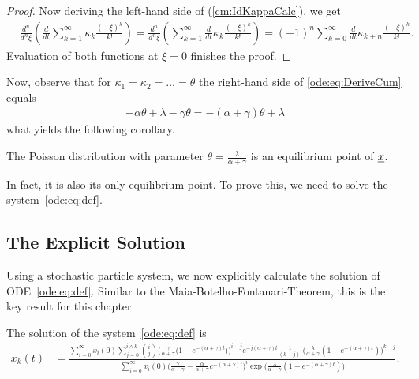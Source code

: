 \begin{proof}
\noindent
Now deriving the left-hand side of (\ref{cm:IdKappaCalc}), we get
\begin{align*}
&\frac{d^n}{d^n \xi}
\left(
\frac{d}{d t} \sum_{k=1}^\infty \kappa_k \frac{(-\xi)^k}{k!}
\right)
= \frac{d^n}{d^n \xi}
\left(
\sum_{k=1}^\infty \frac{d}{d t} \kappa_k \frac{(-\xi)^k}{k!}
\right)
= (-1)^n \sum_{k=0}^\infty \frac{d}{d t} \kappa_{k+n} \frac{(-\xi)^k}{k!} .
\end{align*}
Evaluation of both functions at $\xi = 0$ finishes the proof.
\end{proof}

\noindent
Now, observe that for $\kappa_1 = \kappa_2 = \ldots = \theta$ the right-hand side of
\eqref{ode:eq:DeriveCum} equals
\begin{align*}
-\alpha \theta + \lambda - \gamma \theta = - (\alpha + \gamma) \theta + \lambda
\end{align*}
what yields the following corollary.

\begin{Corollary}\label{ode:c:ex_stat_point}
The Poisson distribution with parameter $\theta = \frac{\lambda}{\alpha +
\gamma}$ is an equilibrium point of $\underline{x}$.
\end{Corollary}

\noindent
In fact, it is also its only equilibrium point. To prove this, we need to solve the
system~\eqref{ode:eq:def}.

\subsection{The Explicit Solution}
Using a stochastic particle system, we now explicitly calculate the solution of
ODE~\eqref{ode:eq:def}. Similar to the Maia-Botelho-Fontanari-Theorem, this is
the key result for this chapter.

\begin{Theorem} \label{ode:t:expl_solution}
The solution of the system~\eqref{ode:eq:def} is
\small
\begin{align} \label{ode:eq:expl_solution}
x_k(t) 
& = \frac{ \sum_{i=0}^\infty x_i(0) \sum_{j=0}^{i\wedge k}
    \binom{i}{j} \Big(\frac{\gamma}{\alpha+\gamma}\big(
    1-e^{-(\alpha+\gamma)t}\big)\Big)^{i-j}
    e^{-j(\alpha+\gamma)t} \frac{1}{(k-j)!}
    \Big(\frac{\lambda}{\alpha+\gamma} (1-e^{-(\alpha+\gamma)t})
    \Big)^{k-j}}{ \sum_{i=0}^\infty x_i(0)
    \Big(\frac{\gamma}{\alpha+\gamma} - \frac{\alpha}{\alpha+\gamma}
    e^{-(\alpha+\gamma)t}\Big)^i
    \exp\Big(\frac{\lambda}{\alpha+\gamma}(1-e^{-(\alpha+\gamma)t})
    \Big)}.
\end{align}
\end{Theorem}

